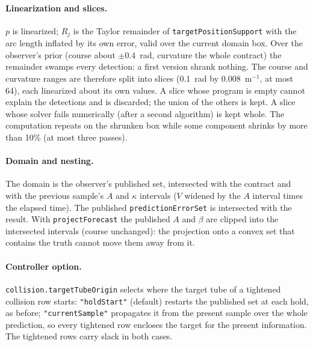 \documentclass[11pt]{article}
\begin{document}
\paragraph{Linearization and slices.} $p$ is linearized; $R_j$ is the Taylor
remainder of \texttt{targetPositionSupport} with the arc length inflated by
its own error, valid over the current domain box. Over the observer's prior
(course about $\pm0.4$~rad, curvature the whole contract) the remainder
swamps every detection: a first version shrank nothing. The course and
curvature ranges are therefore split into slices (0.1~rad by
0.008~m$^{-1}$, at most 64), each linearized about its own values. A slice
whose program is empty cannot explain the detections and is discarded; the
union of the others is kept. A slice whose solver fails numerically (after a
second algorithm) is kept whole. The computation repeats on the shrunken box
while some component shrinks by more than 10\% (at most three passes).

\paragraph{Domain and nesting.} The domain is the observer's published set,
intersected with the contract and with the previous sample's $A$ and $\kappa$
intervals ($V$ widened by the $A$ interval times the elapsed time). The
published \texttt{predictionErrorSet} is intersected with the result. With
\texttt{projectForecast} the published $A$ and $\beta$ are clipped into the
intersected intervals (course unchanged): the projection onto a convex set
that contains the truth cannot move them away from it.

\paragraph{Controller option.} \texttt{collision.targetTubeOrigin} selects
where the target tube of a tightened collision row starts:
\texttt{"holdStart"} (default) restarts the published set at each hold, as
before; \texttt{"currentSample"} propagates it from the present sample over the
whole prediction, so every tightened row encloses the target for the present
information. The tightened rows carry slack in both cases.
\end{document}
